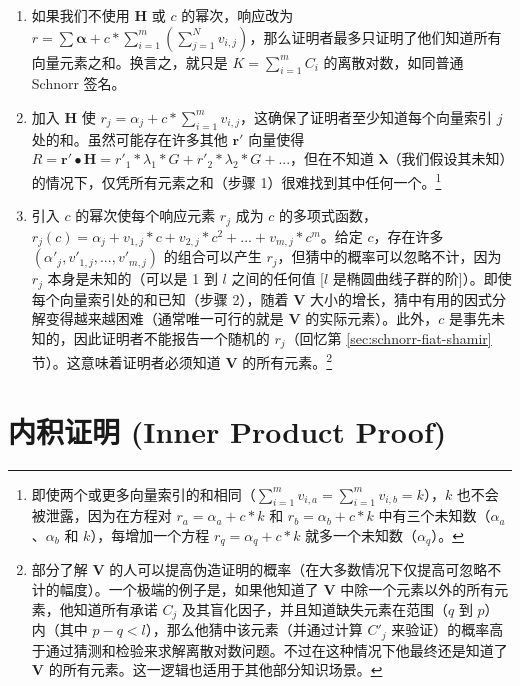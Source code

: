 \begin{enumerate}
    \item 如果我们不使用 $\boldsymbol{H}$ 或 $c$ 的幂次，响应改为 $r = \sum \boldsymbol{\alpha} + c* \sum_{i=1}^{m} (\sum_{j=1}^{N} v_{i,j})$，那么证明者最多只证明了他们知道所有向量元素之和。换言之，就只是 $K = \sum_{i=1}^{m} C_i$ 的离散对数，如同普通 Schnorr 签名。

    \item 加入 $\boldsymbol{H}$ 使 $r_j = \alpha_j +  c* \sum_{i=1}^{m} v_{i,j}$，这确保了证明者至少知道每个向量索引 $j$ 处的和。虽然可能存在许多其他 $\boldsymbol{r'}$ 向量使得 $R = \boldsymbol{r'} \bullet \boldsymbol{H} = r'_1*\lambda_1*G + r'_2*\lambda_2*G + ...$，但在不知道 $\boldsymbol{\lambda}$（我们假设其未知）的情况下，仅凭所有元素之和（步骤 1）很难找到其中任何一个。\footnote{即使两个或更多向量索引的和相同（$\sum_{i=1}^{m} v_{i,a} = \sum_{i=1}^{m} v_{i,b} = k$），$k$ 也不会被泄露，因为在方程对 $r_a = \alpha_a + c*k$ 和 $r_b = \alpha_b + c*k$ 中有三个未知数（$\alpha_a$、$\alpha_b$ 和 $k$），每增加一个方程 $r_q = \alpha_q + c*k$ 就多一个未知数（$\alpha_q$）。}

    \item 引入 $c$ 的幂次使每个响应元素 $r_j$ 成为 $c$ 的多项式函数，$r_j(c) = \alpha_j + v_{1,j}*c + v_{2,j}*c^2 + ... + v_{m,j}*c^m$。给定 $c$，存在许多 $(\alpha'_j, v'_{1,j}, ..., v'_{m,j})$ 的组合可以产生 $r_j$，但猜中的概率可以忽略不计，因为 $r_j$ 本身是未知的（可以是 1 到 $l$ 之间的任何值 [$l$ 是椭圆曲线子群的阶]）。即使每个向量索引处的和已知（步骤 2），随着 $\boldsymbol{V}$ 大小的增长，猜中有用的因式分解变得越来越困难（通常唯一可行的就是 $\boldsymbol{V}$ 的实际元素）。此外，$c$ 是事先未知的，因此证明者不能报告一个随机的 $r_j$（回忆第 \ref{sec:schnorr-fiat-shamir} 节）。这意味着证明者必须知道 $\boldsymbol{V}$ 的所有元素。\footnote{部分了解 $\boldsymbol{V}$ 的人可以提高伪造证明的概率（在大多数情况下仅提高可忽略不计的幅度）。一个极端的例子是，如果他知道了 $\boldsymbol{V}$ 中除一个元素以外的所有元素，他知道所有承诺 $C_j$ 及其盲化因子，并且知道缺失元素在范围（$q$ 到 $p$）内（其中 $p - q < l$），那么他猜中该元素（并通过计算 $C'_j$ 来验证）的概率高于通过猜测和检验来求解离散对数问题。不过在这种情况下他最终还是知道了 $\boldsymbol{V}$ 的所有元素。这一逻辑也适用于其他部分知识场景。}
\end{enumerate}


\section{内积证明 (Inner Product Proof)}


